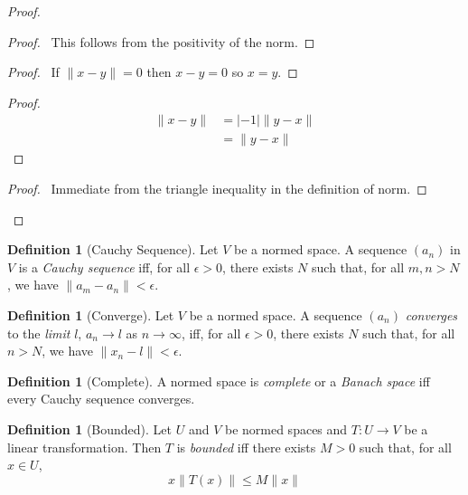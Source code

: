 \documentclass{book}
\theoremstyle{definition}
\newtheorem{df}[lm]{Definition}
\begin{document}
  \begin{proof}
    \begin{proof}
      \pf\ This follows from the positivity of the norm.
    \end{proof}
    \begin{proof}
      \pf\ If $\| x - y \| = 0$ then $x - y = 0$ so $x = y$.
    \end{proof}
    \begin{proof}
      \pf\ \begin{align*}
        \| x - y \| & = | -1 | \| y - x \| \\
        & = \| y - x \|
      \end{align*}
    \end{proof}
    \begin{proof}
      \pf\ Immediate from the triangle inequality in the definition of norm.
    \end{proof}
  \end{proof}
  
  \begin{df}[Cauchy Sequence]
    Let $V$ be a normed space. A sequence $(a_n)$ in $V$ is a \emph{Cauchy
      sequence} iff, for all $\epsilon > 0$, there exists $N$ such that, for all 
    $m,
    n > N$, we have $\| a_m - a_n \| < \epsilon$.
  \end{df}
  
  \begin{df}[Converge]
    Let $V$ be a normed space. A sequence $(a_n)$ \emph{converges} to the
    \emph{limit} $l$, $a_n \rightarrow l$ as $n \rightarrow \infty$, iff, for 
    all
    $\epsilon > 0$, there exists $N$ such that, for all $n > N$, we have $\| x_n 
    -
    l \| < \epsilon$.
  \end{df}
  
  \begin{df}[Complete]
    A normed space is \emph{complete} or a \emph{Banach space} iff every Cauchy
    sequence converges.
  \end{df}
  
  \begin{df}[Bounded]
    Let $U$ and $V$ be normed spaces and $T : U \rightarrow V$ be a linear
    transformation. Then $T$ is \emph{bounded} iff there exists $M > 0$ such 
    that,
    for all $x \in U$,
    \[x \| T(x) \| \leq M \| x \| \]
  \end{df}
  
\end{document}

